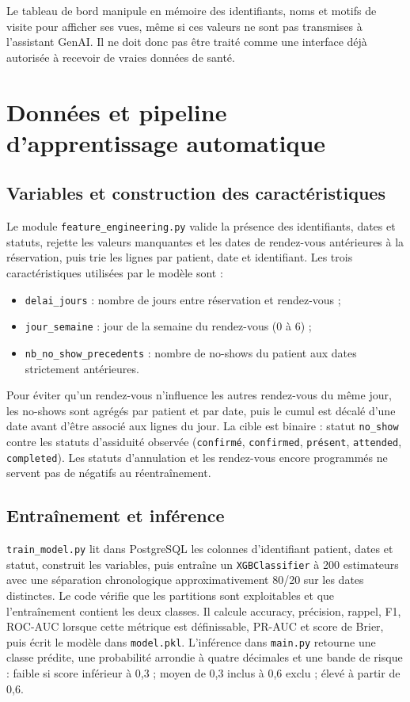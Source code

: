 \documentclass[11pt,a4paper]{report}
\newcommand{\code}[1]{\texttt{#1}}
\begin{document}
Le tableau de bord manipule en mémoire des identifiants, noms et motifs de
visite pour afficher ses vues, même si ces valeurs ne sont pas transmises à
l'assistant GenAI. Il ne doit donc pas être traité comme une interface déjà
autorisée à recevoir de vraies données de santé.

\chapter{Données et pipeline d'apprentissage automatique}
\section{Variables et construction des caractéristiques}
Le module \code{feature\_engineering.py} valide la présence des identifiants,
dates et statuts, rejette les valeurs manquantes et les dates de rendez-vous
antérieures à la réservation, puis trie les lignes par patient, date et
identifiant. Les trois caractéristiques utilisées par le modèle sont :
\begin{itemize}
  \item \code{delai\_jours} : nombre de jours entre réservation et rendez-vous ;
  \item \code{jour\_semaine} : jour de la semaine du rendez-vous (0 à 6) ;
  \item \code{nb\_no\_show\_precedents} : nombre de no-shows du patient aux
        dates strictement antérieures.
\end{itemize}
Pour éviter qu'un rendez-vous n'influence les autres rendez-vous du même jour,
les no-shows sont agrégés par patient et par date, puis le cumul est décalé
d'une date avant d'être associé aux lignes du jour. La cible est binaire :
statut \code{no\_show} contre les statuts d'assiduité observée
(\code{confirmé}, \code{confirmed}, \code{présent}, \code{attended},
\code{completed}). Les statuts d'annulation et les rendez-vous encore
programmés ne servent pas de négatifs au réentraînement.

\section{Entraînement et inférence}
\code{train\_model.py} lit dans PostgreSQL les colonnes d'identifiant patient,
dates et statut, construit les variables, puis entraîne un
\code{XGBClassifier} à 200 estimateurs avec une séparation chronologique
approximativement 80/20 sur les dates distinctes. Le code vérifie que les
partitions sont exploitables et que l'entraînement contient les deux classes.
Il calcule accuracy, précision, rappel, F1, ROC-AUC lorsque cette métrique est
définissable, PR-AUC et score de Brier, puis écrit le modèle dans
\code{model.pkl}. L'inférence dans \code{main.py} retourne une classe prédite,
une probabilité arrondie à quatre décimales et une bande de risque :
faible si score inférieur à 0,3 ; moyen de 0,3 inclus à 0,6 exclu ; élevé à
partir de 0,6.
\end{document}
